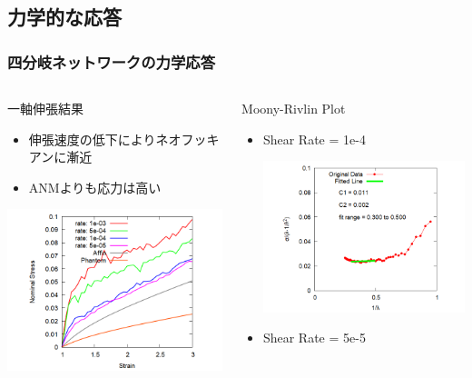 \documentclass[12pt, dvipdfmx]{beamer}
\begin{document}
\subsection{力学的な応答}
\begin{frame}
	\frametitle{四分岐ネットワークの力学応答}
		\begin{columns}[T, onlytextwidth]
				\begin{block}{一軸伸張結果}
					\begin{itemize}
						\item 伸張速度の低下によりネオフッキアンに漸近
						\item ANMよりも応力は高い
					\end{itemize}
					\includegraphics[width=\textwidth]{N48_C4_M3.png}
				\end{block}
				
				\begin{block}{Moony-Rivlin Plot}
					\begin{itemize}
						\item Shear Rate = 1e-4
						
						\includegraphics[width= .6\textwidth]{MR_rate_1e-04.png}
						\item Shear Rate = 5e-5
						

\end{itemize}
\end{block}
\end{columns}
\end{frame}
\end{document}
